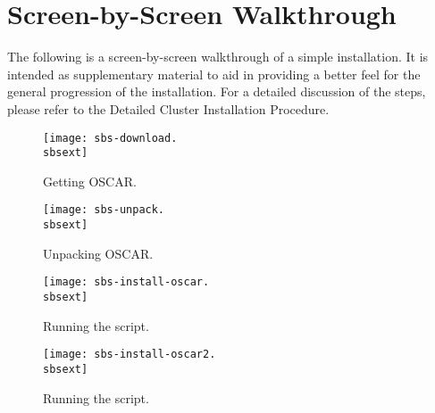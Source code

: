 %
%
%

\newpage

\section{Screen-by-Screen Walkthrough}
\label{app:screen-by-screen}

The following is a screen-by-screen walkthrough of a simple installation.
It is intended as supplementary material to aid in providing a better feel
for the general progression of the installation.  For a detailed discussion
of the steps, please refer to the Detailed Cluster Installation Procedure.

\setlength{\oddsidemargin}{-0.5in}
\setlength{\evensidemargin}{-0.5in}
\setlength{\textwidth}{7.5in}

\begin{figure}[htbp]
  \begin{center}
    \texttt{[image: sbs-download.\\sbsext]}
    \caption{Getting OSCAR.}
    \label{fig:sbs-getting-oscar}
  \end{center}
\end{figure}

\begin{figure}[htbp]
  \begin{center}
    \texttt{[image: sbs-unpack.\\sbsext]}
    \caption{Unpacking OSCAR.}
    \label{fig:sbs-unpacking-oscar}
  \end{center}
\end{figure}

\begin{figure}[htbp]
  \begin{center}
    \texttt{[image: sbs-install-oscar.\\sbsext]}
    \caption{Running the  script.}
    \label{fig:sbs-install-oscar}
  \end{center}
\end{figure}

\begin{figure}[htbp]
  \begin{center}
    \texttt{[image: sbs-install-oscar2.\\sbsext]}
    \caption{Running the  script.}
    \label{fig:sbs-install-oscar2}
  \end{center}
\end{figure}

